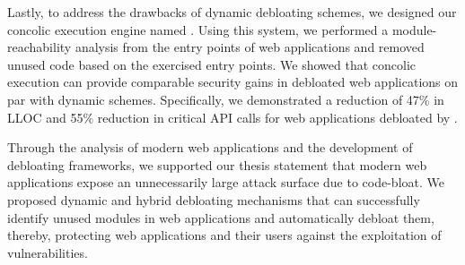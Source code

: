 Lastly, to address the drawbacks of dynamic debloating schemes, we designed our concolic execution engine named \animatedead{}. 
Using this system, we performed a module-reachability analysis from the entry points of web applications and removed unused code based on the exercised entry points. 
We showed that concolic execution can provide comparable security gains in debloated web applications on par with dynamic schemes. 
Specifically, we demonstrated a reduction of 47\% in LLOC and 55\% reduction in critical API calls for web applications debloated by \animatedead{}. 

Through the analysis of modern web applications and the development of debloating frameworks, we supported our thesis statement that modern web applications expose an unnecessarily large attack surface due to code-bloat. 
We proposed dynamic and hybrid debloating mechanisms that can successfully identify unused modules in web applications and automatically debloat them, thereby, protecting web applications and their users against the exploitation of vulnerabilities. 